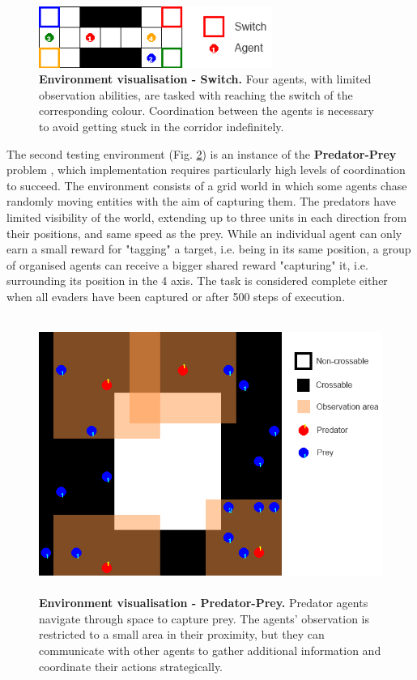 \documentclass[a4paper,singleside,12pt]{report} %
\begin{document}
\begin{figure}
  \centering
  \includegraphics[height=2cm]{images/switch.png}
  \caption{\textbf{Environment visualisation - Switch.} Four agents, with limited observation abilities, are tasked with reaching the switch of the corresponding colour. Coordination between the agents is necessary to avoid getting stuck in the corridor indefinitely.}
  \label{fig:switch}
\end{figure}

The second testing environment (Fig. \ref{fig:pursuit}) is an instance of the \textbf{Predator-Prey} problem \cite{gupta2017cooperative}, which implementation requires particularly high levels of coordination to succeed. The environment consists of a grid world in which some agents chase randomly moving entities with the aim of capturing them. The predators have limited visibility of the world, extending up to three units in each direction from their positions, and same speed as the prey. While an individual agent can only earn a small reward for "tagging" a target, i.e. being in its same position, a group of organised agents can receive a bigger shared reward "capturing" it, i.e. surrounding its position in the 4 axis. The task is considered complete either when all evaders have been captured or after 500 steps of execution.

\begin{figure}
  \centering
  \includegraphics[height=9cm]{images/pursuit.png}
  \caption{\textbf{Environment visualisation - Predator-Prey.} Predator agents navigate through space to capture prey. The agents' observation is restricted to a small area in their proximity, but they can communicate with other agents to gather additional information and coordinate their actions strategically.}
  \label{fig:pursuit}
\end{figure}
\end{document}
